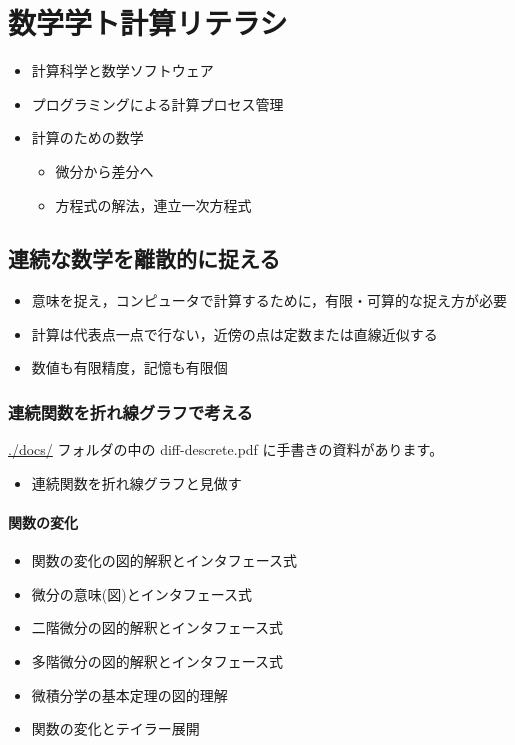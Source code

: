 \documentclass[dvipdfmx,11pat]{jarticle}
\begin{document}
\section{数学学ト計算リテラシ}
\label{sec:orgc9198b7}
\begin{itemize}
\item 計算科学と数学ソフトウェア
\item プログラミングによる計算プロセス管理
\item 計算のための数学
\begin{itemize}
\item 微分から差分へ
\item 方程式の解法，連立一次方程式
\end{itemize}
\end{itemize}
\subsection{連続な数学を離散的に捉える}
\label{sec:org1776942}
\begin{itemize}
\item 意味を捉え，コンピュータで計算するために，有限・可算的な捉え方が必要
\item 計算は代表点一点で行ない，近傍の点は定数または直線近似する
\item 数値も有限精度，記憶も有限個
\end{itemize}
\subsubsection{連続関数を折れ線グラフで考える}
\label{sec:orgc415fc1}

\url{./docs/} フォルダの中の diff-descrete.pdf に手書きの資料があります。
\begin{itemize}
\item 連続関数を折れ線グラフと見做す
\end{itemize}
\paragraph{関数の変化}
\label{sec:org6bf3ac4}
\begin{itemize}
\item 関数の変化の図的解釈とインタフェース式

\item 微分の意味(図)とインタフェース式

\item 二階微分の図的解釈とインタフェース式

\item 多階微分の図的解釈とインタフェース式

\item 微積分学の基本定理の図的理解

\item 関数の変化とテイラー展開
\end{itemize}
\end{document}
